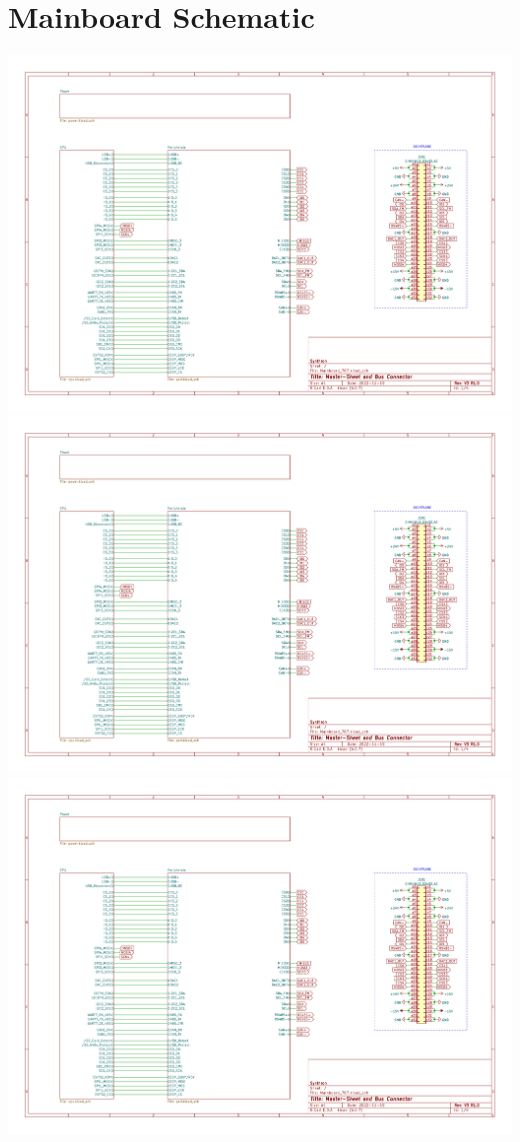 \documentclass[11pt, a4paper, listof=numbered, captions=tableheading, headinclude, table, xcdraw]{scrreprt}
\begin{document}
\chapter{Mainboard Schematic}
\includegraphics[page=1,angle=90,width=\textwidth]{schematics/Mainboard_767.pdf}\newpage
\includegraphics[page=2,angle=90,width=\textwidth]{schematics/Mainboard_767.pdf}\newpage
\includegraphics[page=3,angle=90,width=\textwidth]{schematics/Mainboard_767.pdf}\newpage
\end{document}
